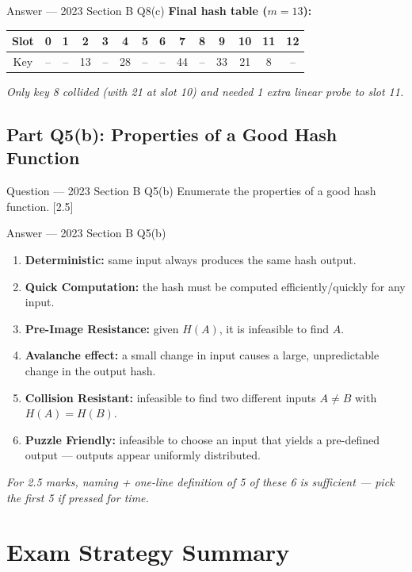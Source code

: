\documentclass[12pt,a4paper]{article}
\begin{document}
\begin{solbox}{Answer --- 2023 Section B Q8(c)}
\textbf{Final hash table ($m=13$):}
\begin{center}
\renewcommand{\arraystretch}{1.2}
\begin{tabular}{c|c|c|c|c|c|c|c|c|c|c|c|c|c}
\toprule
Slot & 0 & 1 & 2 & 3 & 4 & 5 & 6 & 7 & 8 & 9 & 10 & 11 & 12 \\
\midrule
Key  & -- & -- & 13 & -- & 28 & -- & -- & 44 & -- & 33 & 21 & 8 & -- \\
\bottomrule
\end{tabular}
\end{center}
\textit{Only key 8 collided (with 21 at slot 10) and needed 1 extra linear probe to slot 11.}
\end{solbox}

\subsection{Part Q5(b): Properties of a Good Hash Function}
\begin{qbox}{Question --- 2023 Section B Q5(b)}
Enumerate the properties of a good hash function. \hfill [2.5]
\end{qbox}
\begin{solbox}{Answer --- 2023 Section B Q5(b)}
\begin{enumerate}[noitemsep]
  \item \textbf{Deterministic:} same input always produces the same hash output.
  \item \textbf{Quick Computation:} the hash must be computed efficiently/quickly for any input.
  \item \textbf{Pre-Image Resistance:} given $H(A)$, it is infeasible to find $A$.
  \item \textbf{Avalanche effect:} a small change in input causes a large, unpredictable change in the output hash.
  \item \textbf{Collision Resistant:} infeasible to find two different inputs $A \neq B$ with $H(A)=H(B)$.
  \item \textbf{Puzzle Friendly:} infeasible to choose an input that yields a pre-defined output --- outputs appear uniformly distributed.
\end{enumerate}
\textit{For 2.5 marks, naming + one-line definition of 5 of these 6 is sufficient --- pick the first 5 if pressed for time.}
\end{solbox}

\newpage
\section*{Exam Strategy Summary}
\end{document}
